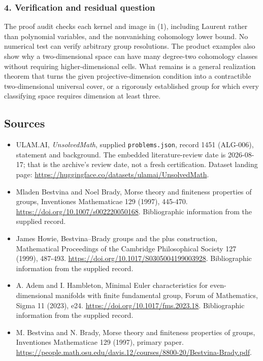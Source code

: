 \documentclass[11pt,a4paper]{article}
\begin{document}
\subsubsection{4. Verification and residual question}
The proof audit checks each kernel and image in (1), including Laurent rather than polynomial variables, and the nonvanishing cohomology lower bound. No numerical test can verify arbitrary group resolutions. The product examples also show why a two-dimensional space can have many degree-two cohomology classes without requiring higher-dimensional cells. What remains is a general realization theorem that turns the given projective-dimension condition into a contractible two-dimensional universal cover, or a rigorously established group for which every classifying space requires dimension at least three.

\subsection{Sources}

{\small

\begin{itemize}

\item[\hypertarget{source:1451:1}{S1}] ULAM.AI, \emph{UnsolvedMath}, supplied \texttt{problems.json}, record 1451 (ALG-006), statement and background. The embedded literature-review date is 2026-08-17; that is the archive’s review date, not a fresh certification. Dataset landing page: \url{https://huggingface.co/datasets/ulamai/UnsolvedMath}.

\item[\hypertarget{source:1451:2}{S2}] Mladen Bestvina and Noel Brady, Morse theory and finiteness properties of groups, Inventiones Mathematicae 129 (1997), 445-470. \url{https://doi.org/10.1007/s002220050168}. Bibliographic information from the supplied record.

\item[\hypertarget{source:1451:3}{S3}] James Howie, Bestvina--Brady groups and the plus construction, Mathematical Proceedings of the Cambridge Philosophical Society 127 (1999), 487-493. \url{https://doi.org/10.1017/S0305004199003928}. Bibliographic information from the supplied record.

\item[\hypertarget{source:1451:4}{S4}] A. Adem and I. Hambleton, Minimal Euler characteristics for even-dimensional manifolds with finite fundamental group, Forum of Mathematics, Sigma 11 (2023), e24. \url{https://doi.org/10.1017/fms.2023.18}. Bibliographic information from the supplied record.

\item[R1] M. Bestvina and N. Brady, Morse theory and finiteness properties of groups, Inventiones Mathematicae 129 (1997), primary paper.
\url{https://people.math.osu.edu/davis.12/courses/8800-20/Bestvina-Brady.pdf}.
\end{itemize}

}

\label{end:1451}
\end{document}
